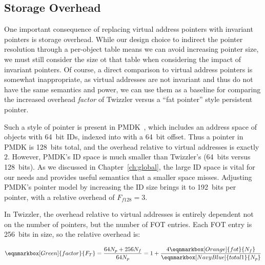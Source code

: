 \subsection{Storage Overhead}

One important consequence of replacing virtual address pointers with invariant pointers is storage
overhead. While our design choice to indirect the pointer resolution through a per-object table
means we can avoid increasing pointer size, we must still consider the size ot that table when
considering the impact of invariant pointers. Of course, a direct comparison to virtual address
pointers is somewhat inappropriate, as virtual addresses are not invariant and thus do not have the
same semantics and power, we can use them as a baseline for comparing the increased overhead
\emph{factor} of Twizzler versus a ``fat pointer'' style persistent pointer.

Such a style of pointer is present in PMDK~\cite{pmdk-pointers}, which includes an address space of
objects with 64~bit IDs, indexed into with a 64~bit offset. Thus a pointer in PMDK is 128~bits
total, and the overhead relative to virtual addresses is exactly $2$. However, PMDK's ID space is much
smaller than Twizzler's (64~bits versus 128~bits). As we discussed in Chapter~\ref{ch:global}, the
large ID space is vital for our needs and provides useful semantics that a smaller space misses.
Adjusting PMDK's pointer model by increasing the ID size brings it to 192~bits per pointer, with a
relative overhead of $F_{f128} = 3$.

In Twizzler, the overhead relative to virtual addresses is entirely dependent not on the number of
pointers, but the number of FOT entries. Each FOT entry is 256~bits in size, so the relative
overhead is:

\begin{equation*}
    \eqnmarkbox[Green]{factor}{F_T}
    = \frac{64
        N_p
        + 256
        N_f
    }{64
        N_p
    }
    = 1 + \frac{4
        \eqnmarkbox[Orange]{fot}{N_f}
    }{
        \eqnmarkbox[NavyBlue]{total1}{N_p}
    }
\end{equation*}
\vspace*{0.5em}


